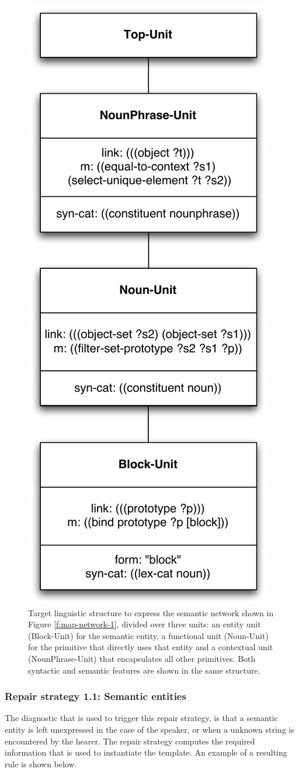 \begin{figure}[htbp]
  \begin{center}
    \includegraphics[width=.4\textwidth]{./composition/figures/learning-1.pdf}
    \caption[First target linguistic structure to express semantic
    constraint network]{Target linguistic structure to express the semantic
      network shown in Figure \ref{f:map-network-1}, divided over
      three units: an entity unit (Block-Unit) for the semantic
      entity, a functional unit (Noun-Unit) for the primitive that
      directly uses that entity and a contextual unit
      (NounPhrase-Unit) that encapsulates all other primitives. Both
      syntactic and semantic features are shown in the same
      structure.}
    \label{f:map-structure-1}
  \end{center}
\end{figure}

\subsubsection*{Repair strategy 1.1: Semantic entities}

The diagnostic that is used to trigger this repair strategy, is that a
semantic entity is left unexpressed in the case of the speaker, or
when a unknown string is encountered by the hearer. The repair
strategy computes the required information that is used to instantiate
the template. An example of a resulting rule is shown below.

